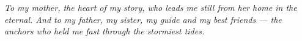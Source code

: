 \chapter*{}
\vspace*{\fill}

\begin{center}
\begin{minipage}{0.75\textwidth}
\itshape
    To my mother, the heart of my story, who leads me still from her home in the eternal.
    And to my father, my sister, my guide and my best friends — the anchors who held me fast through the stormiest tides.
\end{minipage}
\end{center}

\vspace*{\fill}
\newpage
